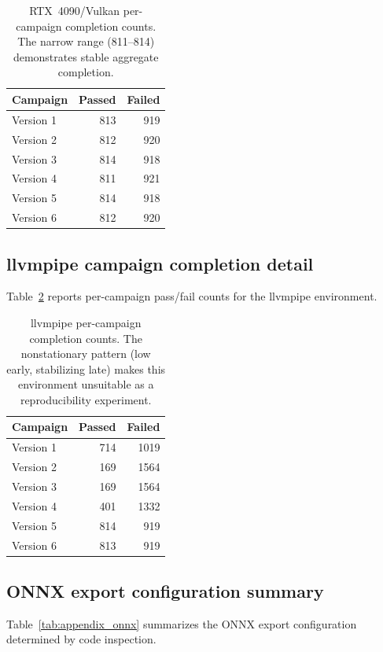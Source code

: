 \documentclass[10pt,twocolumn,letterpaper]{article}
\begin{document}
\begin{table}[h]
\centering\small
\begin{tabular}{lrr}
\toprule
Campaign & Passed & Failed \\
\midrule
Version 1 & 813 & 919 \\
Version 2 & 812 & 920 \\
Version 3 & 814 & 918 \\
Version 4 & 811 & 921 \\
Version 5 & 814 & 918 \\
Version 6 & 812 & 920 \\
\bottomrule
\end{tabular}
\caption{RTX~4090/Vulkan per-campaign completion counts. The narrow range (811--814) demonstrates stable aggregate completion.}
\label{tab:appendix_campaigns}
\end{table}

\subsection{llvmpipe campaign completion detail}

Table~\ref{tab:appendix_llvmpipe} reports per-campaign pass/fail counts for the llvmpipe environment.

\begin{table}[h]
\centering\small
\begin{tabular}{lrr}
\toprule
Campaign & Passed & Failed \\
\midrule
Version 1 & 714 & 1019 \\
Version 2 & 169 & 1564 \\
Version 3 & 169 & 1564 \\
Version 4 & 401 & 1332 \\
Version 5 & 814 & 919 \\
Version 6 & 813 & 919 \\
\bottomrule
\end{tabular}
\caption{llvmpipe per-campaign completion counts. The nonstationary pattern (low early, stabilizing late) makes this environment unsuitable as a reproducibility experiment.}
\label{tab:appendix_llvmpipe}
\end{table}

\subsection{ONNX export configuration summary}

Table~\ref{tab:appendix_onnx} summarizes the ONNX export configuration determined by code inspection.
\end{document}
